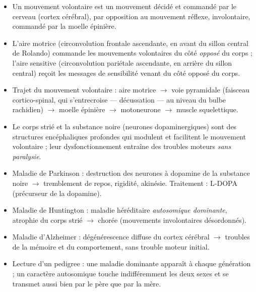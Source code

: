 \documentclass[11pt]{article}
\newcommand{\cle}[1]{{\popxbold\color{popdark}#1}}
\newcounter{popsec}
\newcounter{popsub}
\newcommand{\courssub}[1]{%
  \stepcounter{popsub}%
  \par\vspace{9pt}\noindent{\popxbold\fontsize{11.5}{13}\selectfont\color{popink}{\color{poporange}\thepopsec.\thepopsub}\hspace{6pt}#1}\par\nopagebreak\vspace{4pt}
}
\begin{document}
\begin{itemize}
\item Un \cle{mouvement volontaire} est un mouvement décidé et commandé par le cerveau (cortex cérébral), par opposition au mouvement réflexe, involontaire, commandé par la moelle épinière.
\item L'\cle{aire motrice} (circonvolution frontale ascendante, en avant du sillon central de Rolando) commande les mouvements volontaires du côté \emph{opposé} du corps ; l'\cle{aire sensitive} (circonvolution pariétale ascendante, en arrière du sillon central) reçoit les messages de sensibilité venant du côté opposé du corps.
\item Trajet du mouvement volontaire : aire motrice $\rightarrow$ voie pyramidale (faisceau cortico-spinal, qui s'entrecroise — décussation — au niveau du bulbe rachidien) $\rightarrow$ moelle épinière $\rightarrow$ motoneurone $\rightarrow$ muscle squelettique.
\item Le \cle{corps strié} et la \cle{substance noire} (neurones dopaminergiques) sont des structures encéphaliques profondes qui modulent et facilitent le mouvement volontaire ; leur dysfonctionnement entraîne des troubles moteurs \emph{sans paralysie}.
\item Maladie de Parkinson : destruction des neurones à dopamine de la substance noire $\rightarrow$ tremblement de repos, rigidité, akinésie. Traitement : L-DOPA (précurseur de la dopamine).
\item Maladie de Huntington : maladie héréditaire \emph{autosomique dominante}, atrophie du corps strié $\rightarrow$ chorée (mouvements involontaires désordonnés).
\item Maladie d'Alzheimer : dégénérescence diffuse du cortex cérébral $\rightarrow$ troubles de la mémoire et du comportement, sans trouble moteur initial.
\item Lecture d'un pedigree : une maladie dominante apparaît à chaque génération ; un caractère autosomique touche indifféremment les deux sexes et se transmet aussi bien par le père que par la mère.
\end{itemize}

\courssub{Démarche et corrigé commenté}
\end{document}
